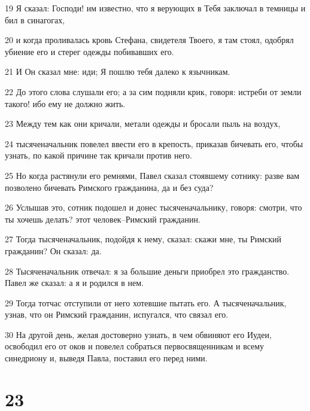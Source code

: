 \par 19 Я сказал: Господи! им известно, что я верующих в Тебя заключал в темницы и бил в синагогах,
\par 20 и когда проливалась кровь Стефана, свидетеля Твоего, я там стоял, одобрял убиение его и стерег одежды побивавших его.
\par 21 И Он сказал мне: иди; Я пошлю тебя далеко к язычникам.
\par 22 До этого слова слушали его; а за сим подняли крик, говоря: истреби от земли такого! ибо ему не должно жить.
\par 23 Между тем как они кричали, метали одежды и бросали пыль на воздух,
\par 24 тысяченачальник повелел ввести его в крепость, приказав бичевать его, чтобы узнать, по какой причине так кричали против него.
\par 25 Но когда растянули его ремнями, Павел сказал стоявшему сотнику: разве вам позволено бичевать Римского гражданина, да и без суда?
\par 26 Услышав это, сотник подошел и донес тысяченачальнику, говоря: смотри, что ты хочешь делать? этот человек--Римский гражданин.
\par 27 Тогда тысяченачальник, подойдя к нему, сказал: скажи мне, ты Римский гражданин? Он сказал: да.
\par 28 Тысяченачальник отвечал: я за большие деньги приобрел это гражданство. Павел же сказал: а я и родился в нем.
\par 29 Тогда тотчас отступили от него хотевшие пытать его. А тысяченачальник, узнав, что он Римский гражданин, испугался, что связал его.
\par 30 На другой день, желая достоверно узнать, в чем обвиняют его Иудеи, освободил его от оков и повелел собраться первосвященникам и всему синедриону и, выведя Павла, поставил его перед ними.

\chapter{23}

